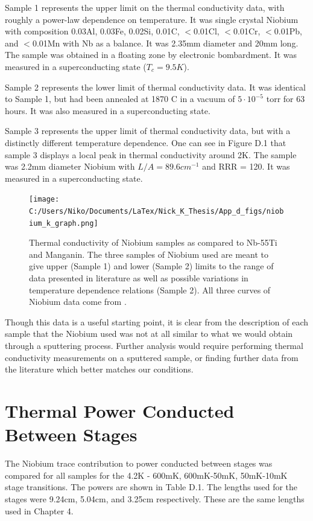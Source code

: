 \documentclass{report}
\begin{document}
\begin{appendices}
Sample 1 represents the upper limit on the thermal conductivity data, with roughly a power-law dependence on temperature. It was single crystal Niobium with composition 0.03Al, 0.03Fe, 0.02Si, 0.01C, $<$0.01Cl, $<$0.01Cr, $<$0.01Pb, and $<$0.01Mn with Nb as a balance. It was 2.35mm diameter and 20mm long. The sample was obtained in a floating zone by electronic bombardment. It was measured in a superconducting state ($T_c = 9.5K$).

Sample 2 represents the lower limit of thermal conductivity data. It was identical to Sample 1, but had been annealed at 1870 C in a vacuum of $5\cdot10^{-5}$ torr for 63 hours. It was also measured in a superconducting state.

Sample 3 represents the upper limit of thermal conductivity data, but with a distinctly different temperature dependence. One can see in Figure D.1 that sample 3 displays a local peak in thermal conductivity around 2K. The sample was 2.2mm diameter Niobium with $L/A = 89.6cm^{-1}$ and RRR = 120. It was measured in a superconducting state.


\begin{figure}[h]
\centering
\texttt{[image: C:/Users/Niko/Documents/LaTex/Nick\_K\_Thesis/App\_d\_figs/niobium\_k\_graph.png]}
\caption{Thermal conductivity of Niobium samples as compared to Nb-55Ti\cite{ols} and Manganin\cite{powell1966}. The three samples of Niobium used are meant to give upper (Sample 1) and lower (Sample 2) limits to the range of data presented in literature as well as possible variations in temperature dependence relations (Sample 2). All three curves of Niobium data come from \cite{tou}.}
\end{figure}

Though this data is a useful starting point, it is clear from the description of each sample that the Niobium used was not at all similar to what we would obtain through a sputtering process. Further analysis would require performing thermal conductivity measurements on a sputtered sample, or finding further data from the literature which better matches our conditions.

\section{Thermal Power Conducted Between Stages}
The Niobium trace contribution to power conducted between stages was compared for all samples for the 4.2K - 600mK, 600mK-50mK, 50mK-10mK stage transitions. The powers are shown in Table D.1. The lengths used for the stages were 9.24cm, 5.04cm, and 3.25cm respectively. These are the same lengths used in Chapter 4.


\end{appendices}
\end{document}
